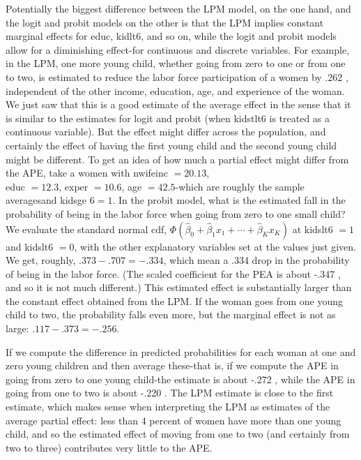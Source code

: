 \documentclass[10pt]{article}
\begin{document}
Potentially the biggest difference between the LPM model, on the one hand, and the logit and probit models on the other is that the LPM implies constant marginal effects for educ, kidlt6, and so on, while the logit and probit models allow for a diminishing effect-for continuous and discrete variables. For example, in the LPM, one more young child, whether going from zero to one or from one to two, is estimated to reduce the labor force participation of a women by .262 , independent of the other income, education, age, and experience of the woman. We just saw that this is a good estimate of the average effect in the sense that it is similar to the estimates for logit and probit (when kidstlt6 is treated as a continuous variable). But the effect might differ across the population, and certainly the effect of having the first young child and the second young child might be different. To get an idea of how much a partial effect might differ from the APE, take a women with nwifeinc $=20.13$,\\
educ $=12.3$, exper $=10.6$, age $=42.5$-which are roughly the sample averagesand kidsge $6=1$. In the probit model, what is the estimated fall in the probability of being in the labor force when going from zero to one small child? We evaluate the standard normal cdf, $\Phi\left(\hat{\beta}_{0}+\hat{\beta}_{1} x_{1}+\cdots+\hat{\beta}_{K} x_{K}\right)$ at kidslt6 $=1$ and kidslt6 $=0$, with the other explanatory variables set at the values just given. We get, roughly, $.373-.707=-.334$, which mean a .334 drop in the probability of being in the labor force. (The scaled coefficient for the PEA is about -.347 , and so it is not much different.) This estimated effect is substantially larger than the constant effect obtained from the LPM. If the woman goes from one young child to two, the probability falls even more, but the marginal effect is not as large: $.117-.373=-.256$.

If we compute the difference in predicted probabilities for each woman at one and zero young children and then average these-that is, if we compute the APE in going from zero to one young child-the estimate is about -.272 , while the APE in going from one to two is about -.220 . The LPM estimate is close to the first estimate, which makes sense when interpreting the LPM as estimates of the average partial effect: less than 4 percent of women have more than one young child, and so the estimated effect of moving from one to two (and certainly from two to three) contributes very little to the APE.
\end{document}
